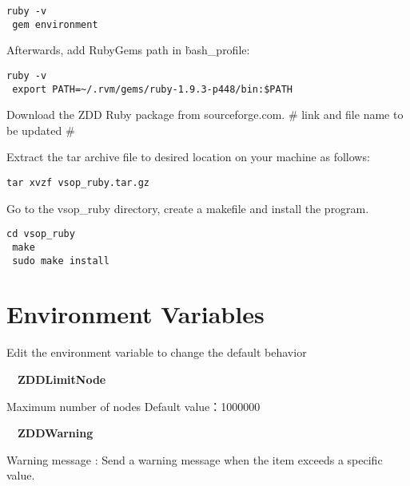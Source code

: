 \begin{Verbatim}[frame=single]
 ruby -v
 gem environment
 \end{Verbatim}
 
 Afterwards, add RubyGems path in \.bash\_profile:
\begin{Verbatim}[frame=single]
 ruby -v
 export PATH=~/.rvm/gems/ruby-1.9.3-p448/bin:$PATH
\end{Verbatim}
 
 Download the ZDD Ruby package from sourceforge.com. 
 \# link and file name to be updated \#
 
 Extract the tar archive file to desired location on your machine as follows:
\begin{Verbatim}[frame=single]
 tar xvzf vsop_ruby.tar.gz
\end{Verbatim}
 
 Go to the vsop\_ruby directory, create a makefile and install the program. 
\begin{Verbatim}[frame=single]
 cd vsop_ruby
 make
 sudo make install
\end{Verbatim}
  
  \section{Environment Variables}
  
 Edit the environment variable to change the default behavior 

　\textbf{ZDDLimitNode}

    Maximum number of nodes Default value：1000000
    
　\textbf{ZDDWarning}

    Warning message : Send a warning message when the item exceeds a specific value. 
    
    
